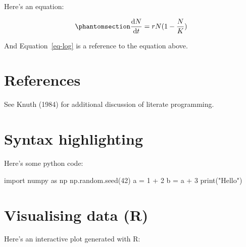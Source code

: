 \documentclass[
  letterpaper,
  DIV=11,
  numbers=noendperiod]{scrreprt}
\newenvironment{Shaded}{\begin{snugshade}}{\end{snugshade}}
\newcommand{\BuiltInTok}[1]{\textcolor[rgb]{0.00,0.23,0.31}{#1}}
\newcommand{\DecValTok}[1]{\textcolor[rgb]{0.68,0.00,0.00}{#1}}
\newcommand{\ImportTok}[1]{\textcolor[rgb]{0.00,0.46,0.62}{#1}}
\newcommand{\NormalTok}[1]{\textcolor[rgb]{0.00,0.23,0.31}{#1}}
\newcommand{\OperatorTok}[1]{\textcolor[rgb]{0.37,0.37,0.37}{#1}}
\newcommand{\StringTok}[1]{\textcolor[rgb]{0.13,0.47,0.30}{#1}}
\theoremstyle{definition}
\theoremstyle{remark}
\begin{document}
Here's an equation:

\begin{equation}\phantomsection\label{eq-log}{ 
\frac{\mathrm{d}N}{\mathrm{d}t} = rN(1 - \frac{N}{K}) 
}\end{equation}

And Equation~\ref{eq-log} is a reference to the equation above.

\section{References}\label{references-8}

See Knuth (1984) for additional discussion of literate programming.

\section{Syntax highlighting}\label{syntax-highlighting-8}

Here's some python code:

\begin{Shaded}
\begin{Highlighting}[]
\ImportTok{import}\NormalTok{ numpy }\ImportTok{as}\NormalTok{ np}
\NormalTok{np.random.seed(}\DecValTok{42}\NormalTok{)}
\NormalTok{a }\OperatorTok{=} \DecValTok{1} \OperatorTok{+} \DecValTok{2}
\NormalTok{b }\OperatorTok{=}\NormalTok{ a }\OperatorTok{+} \DecValTok{3}
\BuiltInTok{print}\NormalTok{(}\StringTok{"Hello"}\NormalTok{)}
\end{Highlighting}
\end{Shaded}

\section{Visualising data (R)}\label{visualising-data-r-8}

Here's an interactive plot generated with R:
\end{document}
